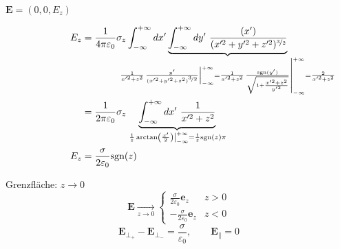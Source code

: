 \documentclass[titlepage,11pt,a4paper,ngerman]{report}
\newcommand{\kq}{\frac{1}{4\pi\epsilon_0}}
\newcommand{\intt}[2]{\int_{#1}^{#2}}
\renewcommand{\vec}[1]{\boldsymbol{#1}}
\renewcommand{\epsilon}{\varepsilon}
\begin{document}
$\vec{E} = (0,0,E_z)$

\begin{align*}
 	E_z &= \kq \sigma_z \intt{-\infty}{+\infty}dx'\underbrace{\intt{-\infty}{+\infty}dy'\ \frac{(x')}{(x'^2 + y'^2 + z'^2)^{\nicefrac{3}{2}}}}_{\mathclap{\frac{1}{x'^2 +z^2}\left.\frac{y'}{(x'^2 + y'^2 + z^2)^{\nicefrac{3}{2}}} \right\rvert_{-\infty}^{+\infty} = \frac{1}{x'^2 +z^2}\left.\frac{\textrm{sgn}(y')}{\sqrt{1 + \frac{x'^2 + z^2}{y'^2}}} \right\rvert_{-\infty}^{+\infty} = \frac{2}{x'^2 +z^2}}}\\
 	&= \frac{1}{2 \pi \epsilon_0} \sigma_z \underbrace{\intt{-\infty}{+\infty} dx'\ \frac{1}{x'^2 + z^2}}_{\left. \frac{1}{z} \arctan \left(\frac{x'}{2}\right)\right\rvert_{-\infty}^{+\infty} = \frac{1}{z} \textrm{sgn}(z)\pi}\\
 	E_z &= \frac{\sigma}{2 \epsilon_0} \textrm{sgn}(z)
\end{align*}

\begin{minipage}{.6\linewidth}
	Grenzfläche: $z \rightarrow 0$
	$$\vec{E} \underset{z \to 0} \longrightarrow \left\{ \begin{array}{cc}
	\frac{\sigma}{2 \epsilon_0} \vec{e}_z & z > 0\\
	-\frac{\sigma}{2 \epsilon_0} \vec{e}_z & z < 0
	\end{array}\right.$$
	$$\vec{E}_{\perp_+} - \vec{E}_{\perp_-} = \frac{\sigma}{\epsilon_0}, \qquad \vec{E}_\parallel = 0$$
\end{minipage}
\begin{minipage}{.4\linewidth}
	\centering
\end{minipage}


\end{document}
